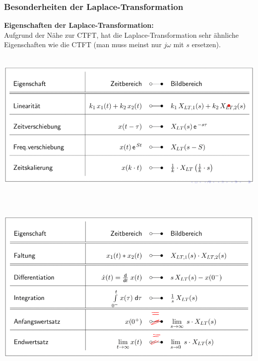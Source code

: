 \documentclass[12pt,a4paper]{scrartcl}
\begin{document}
  \subsubsection{Besonderheiten der Laplace-Transformation}
  \label{sec:sub:sub:besonderheiten-laplace}

  \noindent \textbf{Eigenschaften der Laplace-Transformation:}\\
  \noindent Aufgrund der Nähe zur CTFT, hat die Laplace-Transformation sehr ähnliche Eigenschaften wie die CTFT (man muss meinst nur $j\omega$ mit $s$ ersetzen).\\
  \includegraphics[height=8cm]{Pictures/EigenschaftLT.png}\\
  \includegraphics[height=9cm]{Pictures/EigenschaftLT2.png} \\
\end{document}
